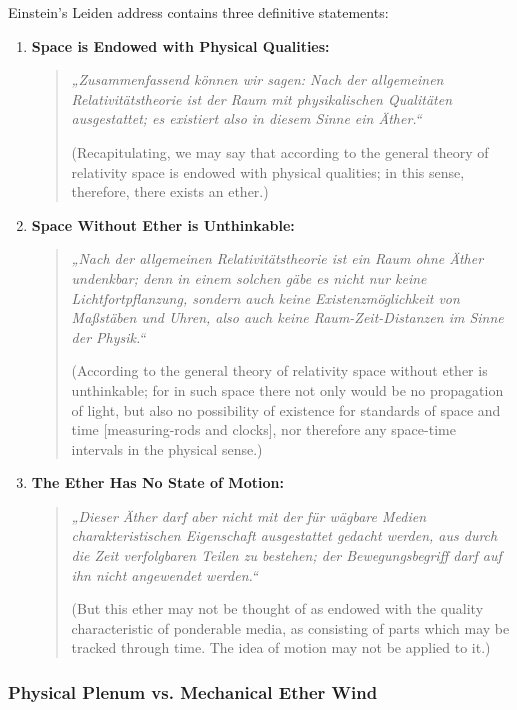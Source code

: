 \documentclass[11pt,a4paper]{article}
\begin{document}
Einstein's Leiden address contains three definitive statements:

\begin{enumerate}
    \item \textbf{Space is Endowed with Physical Qualities:}
    \begin{quote}
    \textit{„Zusammenfassend können wir sagen: Nach der allgemeinen Relativitätstheorie ist der Raum mit physikalischen Qualitäten ausgestattet; es existiert also in diesem Sinne ein Äther.“}
    
    (Recapitulating, we may say that according to the general theory of relativity space is endowed with physical qualities; in this sense, therefore, there exists an ether.)
    \end{quote}

    \item \textbf{Space Without Ether is Unthinkable:}
    \begin{quote}
    \textit{„Nach der allgemeinen Relativitätstheorie ist ein Raum ohne Äther undenkbar; denn in einem solchen gäbe es nicht nur keine Lichtfortpflanzung, sondern auch keine Existenzmöglichkeit von Maßstäben und Uhren, also auch keine Raum-Zeit-Distanzen im Sinne der Physik.“}
    
    (According to the general theory of relativity space without ether is unthinkable; for in such space there not only would be no propagation of light, but also no possibility of existence for standards of space and time [measuring-rods and clocks], nor therefore any space-time intervals in the physical sense.)
    \end{quote}

    \item \textbf{The Ether Has No State of Motion:}
    \begin{quote}
    \textit{„Dieser Äther darf aber nicht mit der für wägbare Medien charakteristischen Eigenschaft ausgestattet gedacht werden, aus durch die Zeit verfolgbaren Teilen zu bestehen; der Bewegungsbegriff darf auf ihn nicht angewendet werden.“}
    
    (But this ether may not be thought of as endowed with the quality characteristic of ponderable media, as consisting of parts which may be tracked through time. The idea of motion may not be applied to it.)
    \end{quote}
\end{enumerate}

\subsubsection{Physical Plenum vs. Mechanical Ether Wind}
\end{document}
